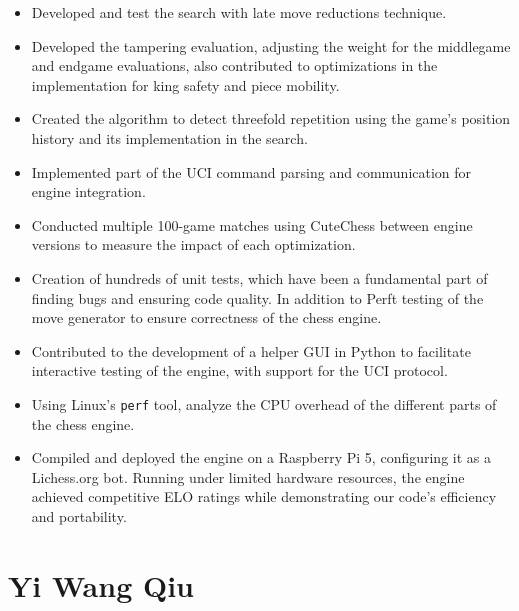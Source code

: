 \begin{itemize}
    \item Developed and test the search with late move reductions technique.

    \item Developed the tampering evaluation, adjusting the weight for the middlegame and endgame evaluations, also contributed to optimizations in the implementation for king safety and piece mobility.

    \item Created the algorithm to detect threefold repetition using the game's position history and its implementation in the search.

    \item Implemented part of the UCI command parsing and communication for engine integration.

    \item Conducted multiple 100-game matches using CuteChess between engine versions to measure the impact of each optimization.

    \item Creation of hundreds of unit tests, which have been a fundamental part of finding bugs and ensuring code quality. In addition to Perft testing of the move generator to ensure correctness of the chess engine.

    \item Contributed to the development of a helper GUI in Python to facilitate interactive testing of the engine, with support for the UCI protocol.    

    \item Using Linux's \texttt{perf} tool, analyze the CPU overhead of the different parts of the chess engine.

    \item Compiled and deployed the engine on a Raspberry Pi 5, configuring it as a Lichess.org bot.  Running under limited hardware resources, the engine achieved competitive ELO ratings while demonstrating our code's efficiency and portability.

\end{itemize}

\section*{Yi Wang Qiu}

